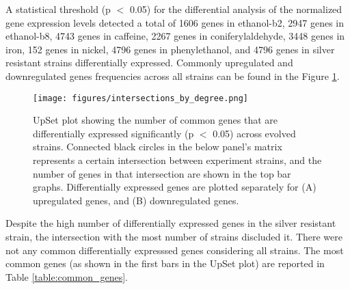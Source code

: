 A statistical threshold (p $<$ 0.05) for the differential analysis of the normalized gene expression levels detected a total of 1606 genes in ethanol-b2, 2947 genes in ethanol-b8, 4743 genes in caffeine, 2267 genes in coniferylaldehyde, 3448 genes in iron, 152 genes in nickel, 4796 genes in phenylethanol, and 4796 genes in silver resistant strains differentially expressed. Commonly upregulated and downregulated genes frequencies across all strains can be found in the Figure \ref{fig:intersections_by_degree}.



\begin{figure}[H]
  \begin{center}
  \texttt{[image: figures/intersections\_by\_degree.png]}
  \caption[UpSet plot showing the number of common genes that are differentially expressed significantly]{UpSet plot showing the number of common genes that are differentially expressed significantly (p $<$ 0.05) across evolved strains. Connected black circles in the below panel's matrix represents a certain intersection between experiment strains, and the number of genes in that intersection are shown in the top bar graphs. Differentially expressed genes are plotted separately for (A) upregulated genes, and (B) downregulated genes.}
  \label{fig:intersections_by_degree}
  \end{center}
\end{figure}

Despite the high number of differentially expressed genes in the silver resistant strain, the intersection with the most number of strains discluded it. There were not any common differentially expresssed genes considering all strains. The most common genes (as shown in the first bars in the UpSet plot) are reported in Table \ref{table:common_genes}.

